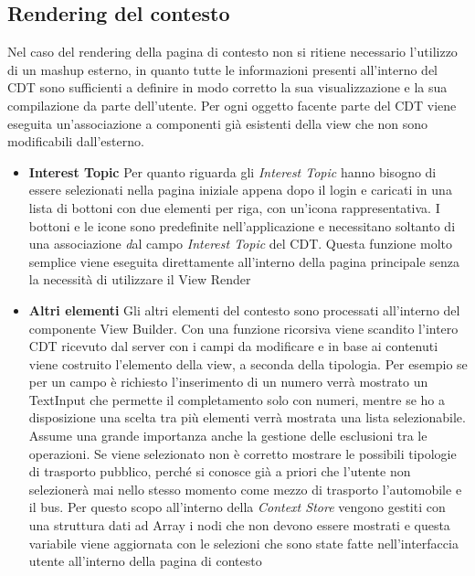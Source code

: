 \subsection{Rendering del contesto} 
Nel caso del rendering della pagina di contesto non si ritiene necessario l'utilizzo di un mashup esterno, in quanto tutte le informazioni presenti all'interno del CDT sono sufficienti a definire in modo corretto la sua visualizzazione e la sua compilazione da parte dell'utente.
	Per ogni oggetto facente parte del CDT viene eseguita un'associazione a componenti già esistenti della view che non sono modificabili dall'esterno.
	\begin{itemize}
		\item \textbf{Interest Topic} Per quanto riguarda gli \emph{Interest Topic} hanno bisogno di essere selezionati nella pagina iniziale appena dopo il login e caricati in una lista di bottoni con due elementi per riga, con un'icona rappresentativa. I bottoni e le icone sono predefinite nell'applicazione e necessitano soltanto di una associazione \emph<nome, elemento> dal campo \emph{Interest Topic} del CDT. Questa funzione molto semplice viene eseguita direttamente all'interno della pagina principale senza la necessità di utilizzare il View Render
		\item \textbf{Altri elementi} Gli altri elementi del contesto sono processati all'interno del componente View Builder. Con una funzione ricorsiva viene scandito l'intero CDT ricevuto dal server con i campi da modificare e in base ai contenuti viene costruito l'elemento della view, a seconda della tipologia. Per esempio se per un campo è richiesto l'inserimento di un numero verrà mostrato un TextInput che permette il completamento solo con numeri, mentre se ho a disposizione una scelta tra più elementi verrà mostrata una lista selezionabile.
		Assume una grande importanza anche la gestione delle esclusioni tra le operazioni. Se viene selezionato  non è corretto mostrare le possibili tipologie di trasporto pubblico, perché si conosce già a priori che l'utente non selezionerà mai nello stesso momento come mezzo di trasporto l'automobile e il bus. Per questo scopo all'interno della \emph{Context Store} vengono gestiti con una struttura dati ad Array i nodi che non devono essere mostrati e questa variabile viene aggiornata con le selezioni che sono state fatte nell'interfaccia utente all'interno della pagina di contesto
	\end{itemize}
	
